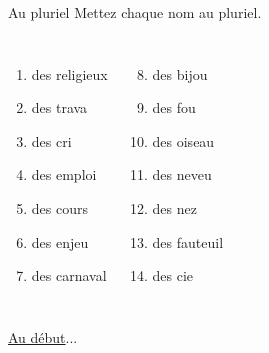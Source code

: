 \begin{frame}{Au pluriel}
  Mettez chaque nom au pluriel.
  \vspace{0.25cm}
  \begin{columns}
      \begin{enumerate}
        \item des religieux\underline{}
        \item des trava\underline{}
        \item des cri\underline{\uncover<4->{s\ \ }}
        \item des emploi\underline{}
        \item des cours\underline{}
        \item des enjeu\underline{}
        \item des carnaval\underline{}
      \end{enumerate}
      \begin{enumerate}
        \setcounter{enumi}{7}
        \item des bijou\underline{}
        \item des fou\underline{}
        \item des oiseau\underline{\uncover<11->{x\ \ }}
        \item des neveu\underline{}
        \item des nez\underline{}
        \item des fauteuil\underline{}
        \item des cie\underline{}
      \end{enumerate}
  \end{columns}
  \vspace{0.25cm}
  \raggedleft\hyperlink{début}{Au début}...
\end{frame}